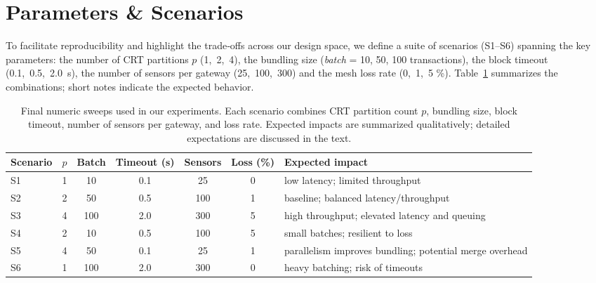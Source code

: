\documentclass[12pt,onecolumn]{IEEEtran} %
\begin{document}
\section{Parameters \& Scenarios}
\label{sec:params-scenarios}

To facilitate reproducibility and highlight the trade‑offs across our design space, we define a suite of scenarios (S1–S6) spanning the key parameters: the number of CRT partitions $p$ (1,~2,~4), the bundling size (\emph{batch} = 10, 50, 100 transactions), the block timeout (0.1,~0.5,~2.0~s), the number of sensors per gateway (25,~100,~300) and the mesh loss rate (0,~1,~5 \%).  Table~\ref{tab:scenarios} summarizes the combinations; short notes indicate the expected behavior.

\begin{table}[!t]
  \centering
  \caption{Final numeric sweeps used in our experiments.  Each scenario combines CRT partition count $p$, bundling size, block timeout, number of sensors per gateway, and loss rate.  Expected impacts are summarized qualitatively; detailed expectations are discussed in the text.}
  \label{tab:scenarios}
  \begin{tabular}{lccccc>{\raggedright\arraybackslash}p{4cm}}
    \toprule
    Scenario & $p$ & Batch & Timeout (s) & Sensors & Loss (\%) & Expected impact \\
    \midrule
    S1 & 1 & 10 & 0.1 & 25  & 0  & low latency; limited throughput \\
    S2 & 2 & 50 & 0.5 & 100 & 1  & baseline; balanced latency/throughput \\
    S3 & 4 & 100 & 2.0 & 300 & 5  & high throughput; elevated latency and queuing \\
    S4 & 2 & 10 & 0.5 & 100 & 5  & small batches; resilient to loss \\
    S5 & 4 & 50 & 0.1 & 25  & 1  & parallelism improves bundling; potential merge overhead \\
    S6 & 1 & 100 & 2.0 & 300 & 0  & heavy batching; risk of timeouts \\
    \bottomrule
  \end{tabular}
\end{table}
\end{document}
